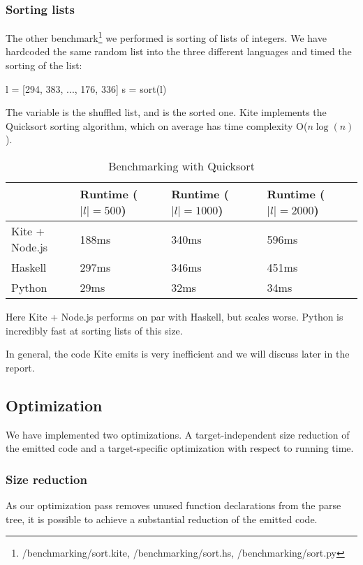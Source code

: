 \subsubsection{Sorting lists}

The other benchmark\footnote{/benchmarking/sort.kite, /benchmarking/sort.hs, /benchmarking/sort.py} we performed is sorting of lists of integers. We have hardcoded the same random list into the three different languages and timed the sorting of the list:

\begin{kite}
l = [294, 383, ..., 176, 336]
s = sort(l)
\end{kite}

The variable  is the shuffled list, and  is the sorted one. Kite implements the  Quicksort sorting algorithm, which on average has time complexity O($n \log(n)$).

\begin{table}[h]
  \centering
  \begin{tabular}{|l|l|l|l|}
    \hline
                   & Runtime ($|l| = 500$) & Runtime ($|l| = 1000$) & Runtime ($|l| = 2000$) \\
    \hline
    Kite + Node.js & 188ms                 & 340ms                  & 596ms                  \\
    Haskell        & 297ms                 & 346ms                  & 451ms                  \\
    Python         & 29ms                  & 32ms                   & 34ms                   \\
    \hline
  \end{tabular}
  \caption{Benchmarking with Quicksort}
\end{table}

Here Kite + Node.js performs on par with Haskell, but scales worse. Python is incredibly fast at sorting lists of this size.

In general, the code Kite emits is very inefficient and we will discuss later in the report.


\subsection{Optimization}

We have implemented two optimizations. A target-independent size reduction of the emitted code and a target-specific optimization with respect to running time.

\subsubsection{Size reduction}
As our optimization pass removes unused function declarations from the parse tree, it is possible to achieve a substantial reduction of the emitted code.

